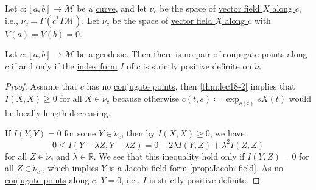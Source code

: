 Let \(c\colon [a, b] \to \mathcal{M} \) be a \hyperref[def:curve]{curve}, and let \(\nu _c\) be the space of \hyperref[def:vector-field-along-curve]{vector field \(X\) along \(c\)}, i.e., \(\nu _c = \Gamma (c^{\ast} T \mathcal{M} )\). Let \(\mathring{\nu }_c\) be the space of \hyperref[def:vector-field-along-curve]{vector field \(X\) along \(c\)} with \(V(a) = V(b) = 0\).

\begin{lemma}\label{lma:lec19}
	Let \(c\colon [a, b] \to \mathcal{M} \) be a \hyperref[def:geodesic]{geodesic}. Then there is no pair of \hyperref[def:conjugate-point]{conjugate points} along \(c\) if and only if the \hyperref[def:index-form]{index form} \(I\) of \(c\) is strictly positive definite on \(\mathring{\nu}_c\)
\end{lemma}
\begin{proof}\let\qed\relax
	Assume that \(c\) has no \hyperref[def:conjugate-point]{conjugate points}, then \autoref{thm:lec18-2} implies that
	\(I(X, X) \geq 0\) for all \(X \in \mathring{\nu }_c\) because otherwise \(c(t, s)\coloneqq \exp _{c(t)} s X(t)\) would be locally length-decreasing.

	If \(I(Y, Y) = 0\) for some \(Y\in \mathring{\nu }_c\), then by \(I(X, X ) \geq 0\), we have
	\[
		0 \leq I(Y - \lambda Z, Y - \lambda Z) = 0 - 2\lambda I(Y, Z) + \lambda ^2 I(Z, Z)
	\]
	for all \(Z\in \mathring{\nu }_c\) and \(\lambda \in \mathbb{R} \). We see that this inequality hold only if \(I(Y, Z) = 0\) for all \(Z\in \mathring{\nu }_c\)., which implies \(Y\) is a \hyperref[def:Jacobi-field]{Jacobi field} form \autoref{prop:Jacobi-field}. As no \hyperref[def:conjugate-point]{conjugate points} along \(c\), \(Y = 0\), i.e., \(I\) is strictly positive definite.
\end{proof}